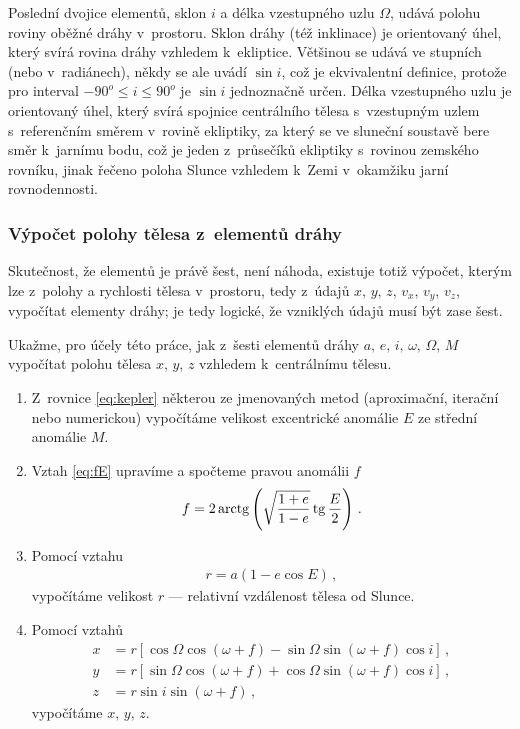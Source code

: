 \documentclass[A4paper, 12pt, oneside]{book}
\begin{document}
Poslední dvojice elementů, sklon $i$ a délka vzestupného uzlu $\Omega$, udává polohu roviny oběžné dráhy v~prostoru. Sklon dráhy (též inklinace) je orientovaný úhel, který svírá rovina dráhy vzhledem k~ekliptice. Většinou se udává ve stupních (nebo v~radiánech), někdy se ale uvádí $\sin i$, což je ekvivalentní definice, protože pro interval $-90^o\leq i \leq 90^o$ je $\sin i$ jednoznačně určen. Délka vzestupného uzlu je orientovaný úhel, který svírá spojnice centrálního tělesa s~vzestupným uzlem s~referenčním směrem v~rovině ekliptiky, za který se ve sluneční soustavě bere směr k~jarnímu bodu, což je jeden z~průsečíků ekliptiky s~rovinou zemského rovníku, jinak řečeno poloha Slunce vzhledem k~Zemi v~okamžiku jarní rovnodennosti.

\subsubsection{Výpočet polohy tělesa z~elementů dráhy}
Skutečnost, že elementů je právě šest, není náhoda, existuje totiž výpočet, kterým lze z~polohy a rychlosti tělesa v~prostoru, tedy z~údajů $x,\, y,\, z,\, v_x,\, v_y,\, v_z$, vypočítat elementy dráhy; je tedy logické, že vzniklých údajů musí být zase šest. 

Ukažme, pro účely této práce, jak z~šesti elementů dráhy $a,\,e,\,i,\,\omega,\,\Omega,\,M$ vypočítat polohu tělesa $x,\, y,\, z$ vzhledem k~centrálnímu tělesu.
\vspace{-12pt}
\begin{enumerate}[label=\arabic*.]
	\item Z~rovnice \eqref{eq:kepler} některou ze jmenovaných metod (aproximační, iterační nebo numerickou) vypočítáme velikost excentrické anomálie $E$ ze střední anomálie $M$.
	\item Vztah \eqref{eq:fE} upravíme a spočteme pravou anomálii $f$
		\begin{align}
			f = 2\operatorname{arctg}\left(\sqrt{\frac{1+e}{1-e}}\operatorname{tg} \frac{E}{2}\right)\,.
		\end{align}
	\item Pomocí vztahu 
\vspace{-12pt}
		\begin{align}
			r=a(1-e\cos E)\,,
		\end{align}
		vypočítáme velikost $r$ --- relativní vzdálenost tělesa od Slunce.
	\item Pomocí vztahů
\vspace{-12pt}
		\begin{align}
			x&=r\left[\cos\Omega\cos(\omega+f)-\sin\Omega\sin(\omega+f)\cos i\right]\,, \\
			y&=r\left[\sin\Omega\cos(\omega+f)+\cos\Omega\sin(\omega+f)\cos i\right]\,, \\
			z&=r\sin i\sin(\omega+f)\,,
		\end{align}
		vypočítáme $x,\,y,\,z$.
\end{enumerate}
\end{document}
